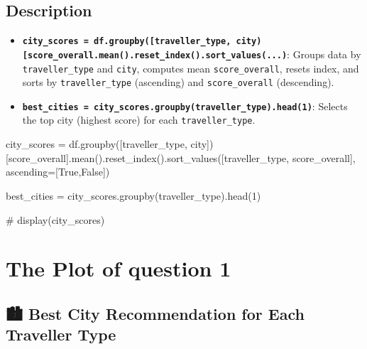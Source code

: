 \documentclass[
  letterpaper,
  DIV=11,
  numbers=noendperiod]{scrartcl}
\newenvironment{Shaded}{\begin{snugshade}}{\end{snugshade}}
\newcommand{\CommentTok}[1]{\textcolor[rgb]{0.37,0.37,0.37}{#1}}
\newcommand{\DecValTok}[1]{\textcolor[rgb]{0.68,0.00,0.00}{#1}}
\newcommand{\NormalTok}[1]{\textcolor[rgb]{0.00,0.23,0.31}{#1}}
\newcommand{\OperatorTok}[1]{\textcolor[rgb]{0.37,0.37,0.37}{#1}}
\newcommand{\StringTok}[1]{\textcolor[rgb]{0.13,0.47,0.30}{#1}}
\newcommand{\VariableTok}[1]{\textcolor[rgb]{0.07,0.07,0.07}{#1}}
\providecommand{\tightlist}{%
  \setlength{\itemsep}{0pt}\setlength{\parskip}{0pt}}
\begin{document}
\subsection{Description}\label{description-2}

\begin{itemize}
\tightlist
\item
  \textbf{\texttt{city\_scores\ =\ df.groupby({[}\textquotesingle{}traveller\_type\textquotesingle{},\ \textquotesingle{}city\textquotesingle{}{]}){[}\textquotesingle{}score\_overall\textquotesingle{}{]}.mean().reset\_index().sort\_values(...)}}:
  Groups data by \texttt{traveller\_type} and \texttt{city}, computes
  mean \texttt{score\_overall}, resets index, and sorts by
  \texttt{traveller\_type} (ascending) and \texttt{score\_overall}
  (descending).
\item
  \textbf{\texttt{best\_cities\ =\ city\_scores.groupby(\textquotesingle{}traveller\_type\textquotesingle{}).head(1)}}:
  Selects the top city (highest score) for each
  \texttt{traveller\_type}.
\end{itemize}

\begin{Shaded}
\begin{Highlighting}[]
\NormalTok{city\_scores }\OperatorTok{=}\NormalTok{ df.groupby([}\StringTok{\textquotesingle{}traveller\_type\textquotesingle{}}\NormalTok{, }\StringTok{\textquotesingle{}city\textquotesingle{}}\NormalTok{])[}\StringTok{\textquotesingle{}score\_overall\textquotesingle{}}\NormalTok{].mean().reset\_index().sort\_values([}\StringTok{\textquotesingle{}traveller\_type\textquotesingle{}}\NormalTok{, }\StringTok{\textquotesingle{}score\_overall\textquotesingle{}}\NormalTok{], ascending}\OperatorTok{=}\NormalTok{[}\VariableTok{True}\NormalTok{,}\VariableTok{False}\NormalTok{])}

\NormalTok{best\_cities }\OperatorTok{=}\NormalTok{ city\_scores.groupby(}\StringTok{\textquotesingle{}traveller\_type\textquotesingle{}}\NormalTok{).head(}\DecValTok{1}\NormalTok{)}

\CommentTok{\# display(city\_scores)}
\end{Highlighting}
\end{Shaded}

\section{The Plot of question 1}\label{the-plot-of-question-1}

\subsection{🏙️ Best City Recommendation for Each Traveller
Type}\label{best-city-recommendation-for-each-traveller-type}
\end{document}
